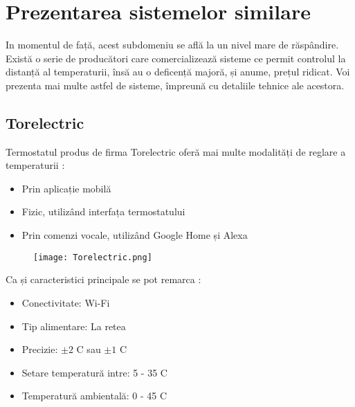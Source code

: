 \chapter{Prezentarea sistemelor similare}\label{ch:2sistemeSimilare}

	In momentul de față, acest subdomeniu se află la un nivel mare de răspândire. Există o serie de producători care comercializează sisteme ce permit controlul la distanță al temperaturii, însă au o deficență majoră, și anume, prețul ridicat. Voi prezenta mai multe astfel de sisteme, împreună cu detaliile tehnice ale acestora. 	

\section{Torelectric}
	Termostatul produs de firma Torelectric oferă mai multe modalități de reglare a temperaturii \cite{torelectric}:
	\begin{itemize}
  	\setlength{\itemindent}{2em}
		\itemsep0em
		\item Prin aplicație mobilă
		\item Fizic, utilizând interfața termostatului
		\item Prin comenzi vocale, utilizând Google Home și Alexa
	\end{itemize}
	

	\begin{figure}[H]
    		\centering
    	\texttt{[image: Torelectric.png]}
	\end{figure}

	Ca și caracteristici principale se pot remarca \cite{torelectric}:
	\begin{itemize}
	\setlength{\itemindent}{2em}
		\itemsep0em
		\item Conectivitate: Wi-Fi
		\item Tip alimentare: La retea
		\item Precizie: $\pm 2$ \textdegree{}C sau $\pm 1$ \textdegree{}C
		\item Setare temperatură intre: 5 - 35 \textdegree{}C
		\item Temperatură ambientală: 0 - 45 \textdegree{}C
	\end{itemize}

